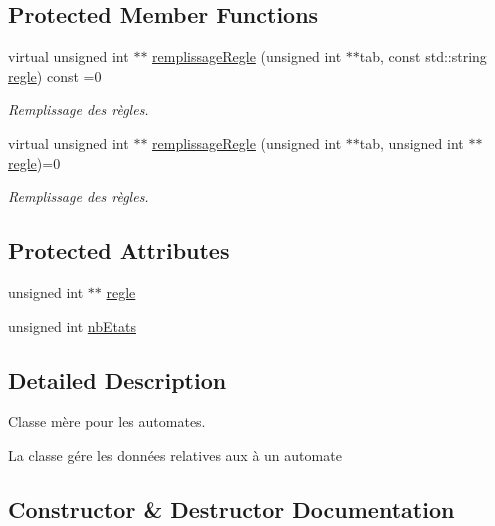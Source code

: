 \subsection*{Protected Member Functions}
\begin{DoxyCompactItemize}
\item 
virtual unsigned int $\ast$$\ast$ \mbox{\hyperlink{class_automate_ada2ede5d67469b4634c73c081a54cd73}{remplissage\+Regle}} (unsigned int $\ast$$\ast$tab, const std\+::string \mbox{\hyperlink{class_automate_a7f9e28d421ef41372273778f182e8f22}{regle}}) const =0
\begin{DoxyCompactList}\small\item\em Remplissage des règles. \end{DoxyCompactList}\item 
virtual unsigned int $\ast$$\ast$ \mbox{\hyperlink{class_automate_ad812bbe51c6e5708e5f66094cbf83fe7}{remplissage\+Regle}} (unsigned int $\ast$$\ast$tab, unsigned int $\ast$$\ast$\mbox{\hyperlink{class_automate_a7f9e28d421ef41372273778f182e8f22}{regle}})=0
\begin{DoxyCompactList}\small\item\em Remplissage des règles. \end{DoxyCompactList}\end{DoxyCompactItemize}
\subsection*{Protected Attributes}
\begin{DoxyCompactItemize}
\item 
unsigned int $\ast$$\ast$ \mbox{\hyperlink{class_automate_a7f9e28d421ef41372273778f182e8f22}{regle}}
\item 
unsigned int \mbox{\hyperlink{class_automate_a45d7a7416a08f736c2e9f12e63c6e7c5}{nb\+Etats}}
\end{DoxyCompactItemize}


\subsection{Detailed Description}
Classe mère pour les automates. 

La classe gére les données relatives aux à un automate 

\subsection{Constructor \& Destructor Documentation}
\mbox{\label{class_automate_a636ba5dc9c4cc901b021326d124517e1}} 
